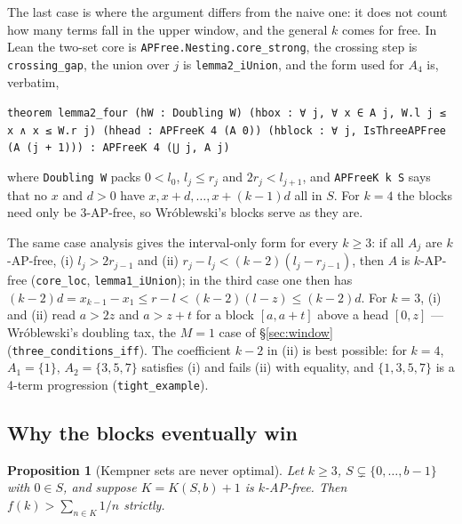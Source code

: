 \documentclass[11pt,a4paper]{article}
\newtheorem{proposition}[theorem]{Proposition}
\theoremstyle{definition}
\theoremstyle{remark}
\newcommand{\code}[1]{\texttt{#1}}
\begin{document}
The last case is where the argument differs from the naive one: it does not count how many terms fall in the upper window, and the general $k$ comes for free. In Lean the two-set core is \code{APFree.\allowbreak{}Nesting.\allowbreak{}core\_\allowbreak{}strong}, the crossing step is \code{crossing\_\allowbreak{}gap}, the union over $j$ is \code{lemma2\_\allowbreak{}iUnion}, and the form used for $A_4$ is, verbatim,

\begin{leancode}
\item \code{theorem lemma2\_\allowbreak{}four (hW : Doubling W) (hbox : ∀ j, ∀ x ∈ A j, W.l j ≤ x ∧ x ≤ W.r j) (hhead : APFreeK 4 (A 0)) (hblock : ∀ j, IsThreeAPFree (A (j + 1))) : APFreeK 4 (⋃ j, A j)}
\end{leancode}

where \code{Doubling W} packs $0 < l_0$, $l_j \le r_j$ and $2 r_j < l_{j+1}$, and \code{APFreeK k S} says that no $x$ and $d>0$ have $x, x+d, \dots, x+(k-1)d$ all in $S$. For $k=4$ the blocks need only be 3-AP-free, so Wr\'oblewski's blocks serve as they are.

The same case analysis gives the interval-only form for every $k \ge 3$: if all $A_j$ are $k$-AP-free, (i) $l_j > 2r_{j-1}$ and (ii) $r_j - l_j < (k-2)(l_j - r_{j-1})$, then $A$ is $k$-AP-free (\code{core\_\allowbreak{}loc}, \code{lemma1\_\allowbreak{}iUnion}); in the third case one then has $(k-2)d = x_{k-1} - x_1 \le r - l < (k-2)(l - z) \le (k-2)d$. For $k = 3$, (i) and (ii) read $a > 2z$ and $a > z + t$ for a block $[a, a+t]$ above a head $[0,z]$ --- Wr\'oblewski's doubling tax, the $M=1$ case of \S\ref{sec:window} (\code{three\_\allowbreak{}conditions\_\allowbreak{}iff}). The coefficient $k-2$ in (ii) is best possible: for $k=4$, $A_1 = \{1\}$, $A_2 = \{3,5,7\}$ satisfies (i) and fails (ii) with equality, and $\{1,3,5,7\}$ is a 4-term progression (\code{tight\_\allowbreak{}example}).

\subsection{Why the blocks eventually win}\label{sec:why}

\begin{proposition}[Kempner sets are never optimal]\label{prop:kempner}
Let $k\ge3$, $S\subsetneq\{0,\dots,b-1\}$ with $0\in S$, and suppose $K=K(S,b)+1$ is $k$-AP-free. Then $f(k)>\sum_{n\in K}1/n$ strictly.
\end{proposition}
\end{document}
